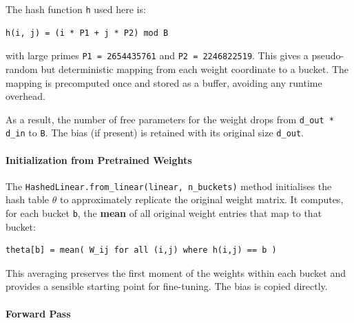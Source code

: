 The hash function \texttt{h} used here is:

\vspace{0.5em}
\begin{mdframed}[backgroundcolor=codebg, linecolor=codeframe, linewidth=1pt, roundcorner=4pt, innerleftmargin=2pt, innerrightmargin=5pt, innertopmargin=5pt, innerbottommargin=5pt]
\begin{lstlisting}
h(i, j) = (i * P1 + j * P2) mod B
\end{lstlisting}
\end{mdframed}
\vspace{0.5em}

with large primes \texttt{P1 = 2654435761} and \texttt{P2 = 2246822519}. This gives a pseudo-random but deterministic mapping from each weight coordinate to a bucket. The mapping is precomputed once and stored as a buffer, avoiding any runtime overhead.

As a result, the number of free parameters for the weight drops from \texttt{d\_out * d\_in} to \texttt{B}. The bias (if present) is retained with its original size \texttt{d\_out}.

\paragraph{Initialization from Pretrained Weights}

The \texttt{HashedLinear.from\_linear(linear, n\_buckets)} method initialises the hash table \textbf{$\theta$} to approximately replicate the original weight matrix. It computes, for each bucket \texttt{b}, the \textbf{mean} of all original weight entries that map to that bucket:

\vspace{0.5em}
\begin{mdframed}[backgroundcolor=codebg, linecolor=codeframe, linewidth=1pt, roundcorner=4pt, innerleftmargin=2pt, innerrightmargin=5pt, innertopmargin=5pt, innerbottommargin=5pt]
\begin{lstlisting}
theta[b] = mean( W_ij for all (i,j) where h(i,j) == b )
\end{lstlisting}
\end{mdframed}
\vspace{0.5em}

This averaging preserves the first moment of the weights within each bucket and provides a sensible starting point for fine-tuning. The bias is copied directly.

\paragraph{Forward Pass}

